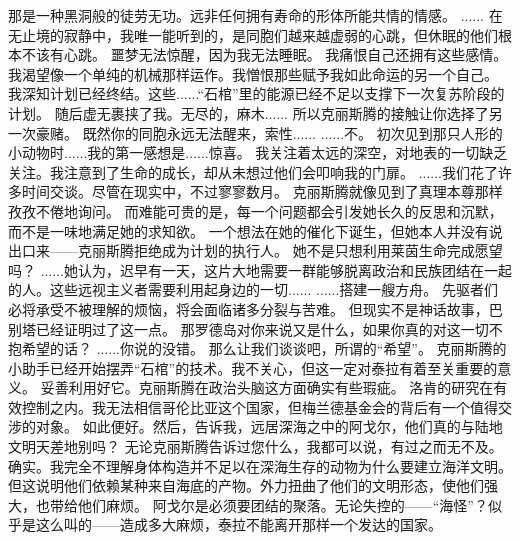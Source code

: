 \documentclass[openany]{book}
\begin{document}
\begin{dialogue}
     那是一种黑洞般的徒劳无功。远非任何拥有寿命的形体所能共情的情感。
     ......
     在无止境的寂静中，我唯一能听到的，是同胞们越来越虚弱的心跳，但休眠的他们根本不该有心跳。
     噩梦无法惊醒，因为我无法睡眠。
     我痛恨自己还拥有这些感情。我渴望像一个单纯的机械那样运作。我憎恨那些赋予我如此命运的另一个自己。
     我深知计划已经终结。这些......“石棺”里的能源已经不足以支撑下一次复苏阶段的计划。
     随后虚无裹挟了我。无尽的，麻木......
     所以克丽斯腾的接触让你选择了另一次豪赌。
     既然你的同胞永远无法醒来，索性......
     ......不。
     初次见到那只人形的小动物时......我的第一感想是......惊喜。
     我关注着太远的深空，对地表的一切缺乏关注。我注意到了生命的成长，却从未想过他们会叩响我的门扉。
     ......我们花了许多时间交谈。尽管在现实中，不过寥寥数月。
     克丽斯腾就像见到了真理本尊那样孜孜不倦地询问。
     而难能可贵的是，每一个问题都会引发她长久的反思和沉默，而不是一味地满足她的求知欲。
     一个想法在她的催化下诞生，但她本人并没有说出口来——克丽斯腾拒绝成为计划的执行人。
     她不是只想利用莱茵生命完成愿望吗？
     ......她认为，迟早有一天，这片大地需要一群能够脱离政治和民族团结在一起的人。这些远视主义者需要利用起身边的一切......
     ......搭建一艘方舟。
     先驱者们必将承受不被理解的烦恼，将会面临诸多分裂与苦难。
     但现实不是神话故事，巴别塔已经证明过了这一点。
     那罗德岛对你来说又是什么，如果你真的对这一切不抱希望的话？
     ......你说的没错。
     那么让我们谈谈吧，所谓的“希望”。
     克丽斯腾的小助手已经开始摆弄“石棺”的技术。我不关心，但这一定对泰拉有着至关重要的意义。
     妥善利用好它。克丽斯腾在政治头脑这方面确实有些瑕疵。
     洛肯的研究在有效控制之内。我无法相信哥伦比亚这个国家，但梅兰德基金会的背后有一个值得交涉的对象。
     如此便好。然后，告诉我，远居深海之中的阿戈尔，他们真的与陆地文明天差地别吗？
     无论克丽斯腾告诉过您什么，我都可以说，有过之而无不及。
     确实。我完全不理解身体构造并不足以在深海生存的动物为什么要建立海洋文明。
     但这说明他们依赖某种来自海底的产物。外力扭曲了他们的文明形态，使他们强大，也带给他们麻烦。
     阿戈尔是必须要团结的聚落。无论失控的——“海怪”？似乎是这么叫的——造成多大麻烦，泰拉不能离开那样一个发达的国家。

\end{dialogue}
\end{document}
